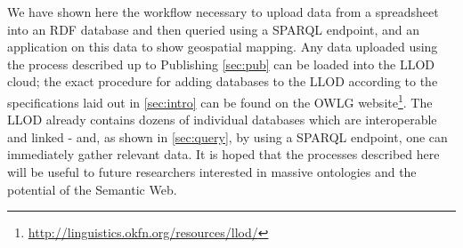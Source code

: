 We have shown here the workflow necessary to upload data from a spreadsheet into an RDF database and then queried using a SPARQL endpoint, and an application on this data to show geospatial mapping. Any data uploaded using the process described up to Publishing \ref{sec:pub} can be loaded into the LLOD cloud; the exact procedure for adding databases to the LLOD according to the specifications laid out in \ref{sec:intro} can be found on the OWLG website\footnote{\url{http://linguistics.okfn.org/resources/llod/}}. The LLOD already contains dozens of individual databases which are interoperable and linked - and, as shown in \ref{sec:query}, by using a SPARQL endpoint, one can immediately gather relevant data. It is hoped that the processes described here will be useful to future researchers interested in massive ontologies and the potential of the Semantic Web. 